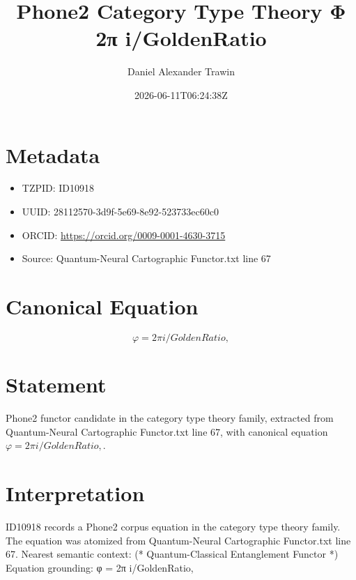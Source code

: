 \documentclass[11pt]{article}
\title{Phone2 Category Type Theory Φ 2π i/GoldenRatio}
\author{Daniel Alexander Trawin}
\date{2026-06-11T06:24:38Z}
\begin{document}
\maketitle
\section*{Metadata}
\begin{itemize}
\item TZPID: ID10918
\item UUID: 28112570-3d9f-5e69-8e92-523733ec60c0
\item ORCID: \url{https://orcid.org/0009-0001-4630-3715}
\item Source: Quantum-Neural Cartographic Functor.txt line 67
\end{itemize}
\section*{Canonical Equation}
\[
φ = 2π i/GoldenRatio,
\]
\section*{Statement}
Phone2 functor candidate in the category type theory family, extracted from Quantum-Neural Cartographic Functor.txt line 67, with canonical equation $φ = 2π i/GoldenRatio,$.
\section*{Interpretation}
ID10918 records a Phone2 corpus equation in the category type theory family. The equation was atomized from Quantum-Neural Cartographic Functor.txt line 67. Nearest semantic context: (* Quantum-Classical Entanglement Functor *) Equation grounding: φ = 2π i/GoldenRatio,
\end{document}
